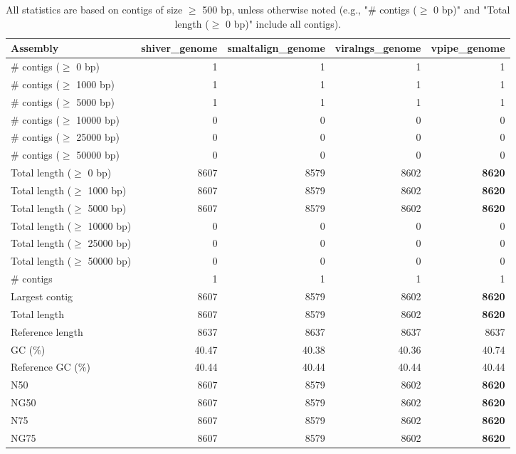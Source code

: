 \documentclass[12pt,a4paper]{article}
\begin{document}
\begin{table}[ht]
\begin{center}
\caption{All statistics are based on contigs of size $\geq$ 500 bp, unless otherwise noted (e.g., "\# contigs ($\geq$ 0 bp)" and "Total length ($\geq$ 0 bp)" include all contigs).}
\begin{tabular}{|l*{4}{|r}|}
\hline
Assembly & shiver\_genome & smaltalign\_genome & viralngs\_genome & vpipe\_genome \\ \hline
\# contigs ($\geq$ 0 bp) & 1 & 1 & 1 & 1 \\ \hline
\# contigs ($\geq$ 1000 bp) & 1 & 1 & 1 & 1 \\ \hline
\# contigs ($\geq$ 5000 bp) & 1 & 1 & 1 & 1 \\ \hline
\# contigs ($\geq$ 10000 bp) & 0 & 0 & 0 & 0 \\ \hline
\# contigs ($\geq$ 25000 bp) & 0 & 0 & 0 & 0 \\ \hline
\# contigs ($\geq$ 50000 bp) & 0 & 0 & 0 & 0 \\ \hline
Total length ($\geq$ 0 bp) & 8607 & 8579 & 8602 & {\bf 8620} \\ \hline
Total length ($\geq$ 1000 bp) & 8607 & 8579 & 8602 & {\bf 8620} \\ \hline
Total length ($\geq$ 5000 bp) & 8607 & 8579 & 8602 & {\bf 8620} \\ \hline
Total length ($\geq$ 10000 bp) & 0 & 0 & 0 & 0 \\ \hline
Total length ($\geq$ 25000 bp) & 0 & 0 & 0 & 0 \\ \hline
Total length ($\geq$ 50000 bp) & 0 & 0 & 0 & 0 \\ \hline
\# contigs & 1 & 1 & 1 & 1 \\ \hline
Largest contig & 8607 & 8579 & 8602 & {\bf 8620} \\ \hline
Total length & 8607 & 8579 & 8602 & {\bf 8620} \\ \hline
Reference length & 8637 & 8637 & 8637 & 8637 \\ \hline
GC (\%) & 40.47 & 40.38 & 40.36 & 40.74 \\ \hline
Reference GC (\%) & 40.44 & 40.44 & 40.44 & 40.44 \\ \hline
N50 & 8607 & 8579 & 8602 & {\bf 8620} \\ \hline
NG50 & 8607 & 8579 & 8602 & {\bf 8620} \\ \hline
N75 & 8607 & 8579 & 8602 & {\bf 8620} \\ \hline
NG75 & 8607 & 8579 & 8602 & {\bf 8620} \\ \hline

\end{tabular}
\end{center}
\end{table}
\end{document}
